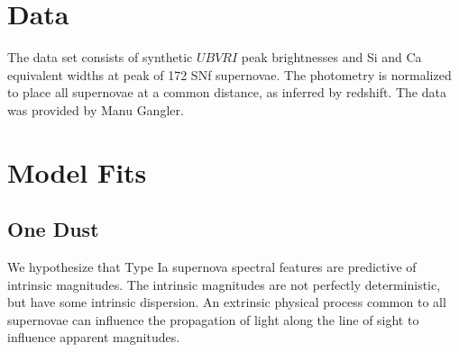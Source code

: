 \documentclass[11pt, oneside]{article}   	%
\begin{document}
\section{Data}
The data set consists of synthetic $UBVRI$ peak brightnesses and Si and Ca equivalent widths at peak
of 172 SNf supernovae.  The photometry is normalized to place all supernovae at a common distance, as
inferred by redshift.
The data was provided by Manu Gangler.

\section{Model Fits}
\subsection{One Dust}
\label{onecolor:sec}
We hypothesize that Type Ia supernova spectral features are predictive of intrinsic
magnitudes.  The intrinsic magnitudes are not perfectly deterministic, but have some intrinsic dispersion.
An extrinsic physical process common to all supernovae can influence the propagation
of light along the line of sight to influence apparent magnitudes. 
\end{document}
